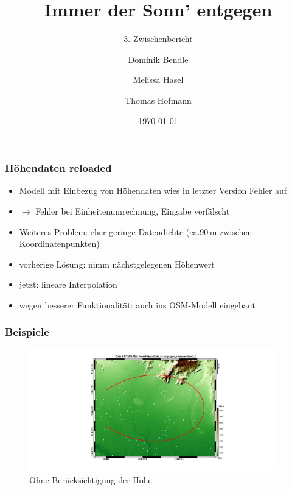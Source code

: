 \documentclass[aspectratio=43]{beamer}
\title{Immer der Sonn' entgegen}
\subtitle{3. Zwischenbericht}
\author{Dominik Bendle \and Melissa Hasel \and Thomas Hofmann}
\date{\today}
\institute{TU Kaiserslautern}
\begin{document}
\begin{frame}[plain]


\end{frame}

\begin{frame}
    \frametitle{Höhendaten reloaded}
    \begin{itemize}
        \item Modell mit Einbezug von Höhendaten wies in letzter Version Fehler auf
        \item[] $\rightarrow$ Fehler bei Einheitenumrechnung, Eingabe verfälscht
        \item Weiteres Problem: eher geringe Datendichte (ca.90\,m zwischen
            Koordinatenpunkten)
        \item vorherige Lösung: nimm nächstgelegenen Höhenwert
        \item jetzt: lineare Interpolation
        \item wegen besserer Funktionalität: auch ins OSM-Modell eingebaut
    \end{itemize}
\end{frame}

\begin{frame}
    \frametitle{Beispiele}
    \begin{figure}[t]
        \centering
        \includegraphics[width=0.95\textwidth]{bilder/nostreetnoele.jpg}
        \caption{Ohne Berücksichtigung der Höhe}
    \end{figure}
\end{frame}
\end{document}
